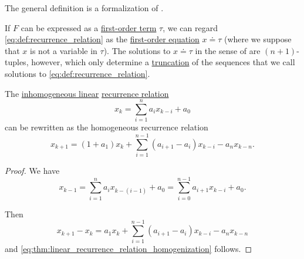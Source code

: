 \begin{comments}
  \item The general definition is a formalization of \cite[def. 2.4.4]{Rosen2019DiscreteMathematics}.

  \item If \( F \) can be expressed as a \hyperref[def:first_order_syntax/term]{first-order term} \( \tau \), we can regard \eqref{eq:def:recurrence_relation} as the \hyperref[def:first_order_equation]{first-order equation} \( x \doteq \tau \) (where we suppose that \( x \) is not a variable in \( \tau \)). The solutions to \( x \doteq \tau \) in the sense of  are \( (n + 1) \)-tuples, however, which only determine a \hyperref[def:truncated_sequence]{truncation} of the sequences that we call solutions to \eqref{eq:def:recurrence_relation}.
\end{comments}

\begin{proposition}\label{thm:linear_recurrence_relation_homogenization}
  The \hyperref[def:recurrence_relation/linear]{inhomogeneous linear} \hyperref[def:recurrence_relation]{recurrence relation}
  \begin{equation*}
    x_k = \sum_{i=1}^n a_i x_{k-i} + a_0
  \end{equation*}
  can be rewritten as the homogeneous recurrence relation
  \begin{equation}\label{eq:thm:linear_recurrence_relation_homogenization}
    x_{k+1}
    =
    (1 + a_1) x_k + \sum_{i=1}^{n-1} (a_{i+1} - a_i) x_{k-i} - a_n x_{k-n}.
  \end{equation}
\end{proposition}
\begin{proof}
  We have
  \begin{equation*}
    x_{k-1}
    =
    \sum_{i=1}^n a_i x_{k-(i-1)} + a_0
    =
    \sum_{i=0}^{n-1} a_{i+1} x_{k-i} + a_0.
  \end{equation*}

  Then
  \begin{equation*}
    x_{k+1} - x_k = a_1 x_k +\sum_{i=1}^{n-1} (a_{i+1} - a_i) x_{k-i} - a_n x_{k-n}
  \end{equation*}
  and \eqref{eq:thm:linear_recurrence_relation_homogenization} follows.
\end{proof}

